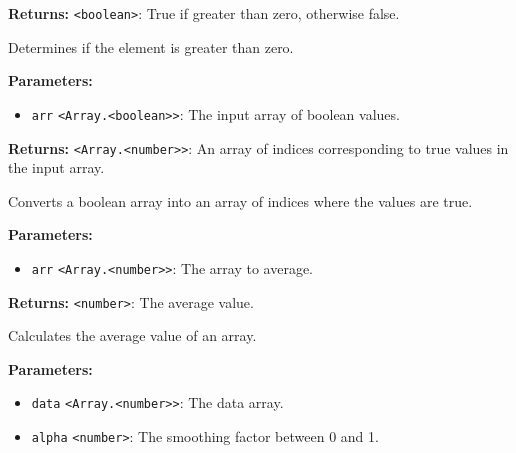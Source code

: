 \documentclass[12pt,a4paper]{article}
\begin{document}
\noindent \textbf{Returns:} \texttt{<boolean>}: True if greater than zero, otherwise false.

\noindent Determines if the element is greater than zero.

\vspace{5mm}
\noindent {}


\noindent \textbf{Parameters:}
\begin{itemize}
  \item \texttt{arr} \texttt{<Array.<boolean>>}: The input array of boolean values.
\end{itemize}

\noindent \textbf{Returns:} \texttt{<Array.<number>>}: An array of indices corresponding to \textasciigrave{}true\textasciigrave{} values in the input array.

\noindent Converts a boolean array into an array of indices where the values are \textasciigrave{}true\textasciigrave{}.

\vspace{5mm}
\noindent {}


\noindent \textbf{Parameters:}
\begin{itemize}
  \item \texttt{arr} \texttt{<Array.<number>>}: The array to average.
\end{itemize}

\noindent \textbf{Returns:} \texttt{<number>}: The average value.

\noindent Calculates the average value of an array.

\vspace{5mm}
\noindent {}


\noindent \textbf{Parameters:}
\begin{itemize}
  \item \texttt{data} \texttt{<Array.<number>>}: The data array.
  \item \texttt{alpha} \texttt{<number>}: The smoothing factor between 0 and 1.
\end{itemize}
\end{document}
